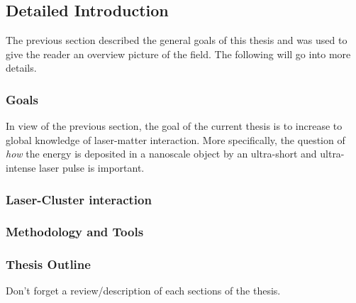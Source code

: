 \subsection{Detailed Introduction}

The previous section described the general goals of this thesis and was used to
give the reader an overview picture of the field. The following will go
into more details.

\subsubsection{Goals}
In view of the previous section, the goal of the current thesis is to increase
to global knowledge of laser-matter interaction. More specifically, the
question of \textit{how} the energy is deposited in a nanoscale object by an
ultra-short and ultra-intense laser pulse is important.

\cite{Young2010,Chapman2011}

\subsubsection{Laser-Cluster interaction}




\subsubsection{Methodology and Tools}



\subsubsection{Thesis Outline}
Don't forget a review/description of each sections of the thesis.



